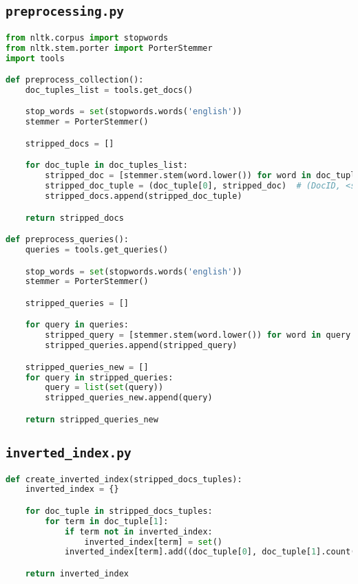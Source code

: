 \subsection{\texttt{preprocessing.py}}
\begin{lstlisting}[language=Python]
from nltk.corpus import stopwords
from nltk.stem.porter import PorterStemmer
import tools

def preprocess_collection():
    doc_tuples_list = tools.get_docs()

    stop_words = set(stopwords.words('english'))
    stemmer = PorterStemmer()

    stripped_docs = []

    for doc_tuple in doc_tuples_list:
        stripped_doc = [stemmer.stem(word.lower()) for word in doc_tuple[1] if word.lower() not in stop_words]
        stripped_doc_tuple = (doc_tuple[0], stripped_doc)  # (DocID, <stripped_doc>)
        stripped_docs.append(stripped_doc_tuple)

    return stripped_docs

def preprocess_queries():
    queries = tools.get_queries()

    stop_words = set(stopwords.words('english'))
    stemmer = PorterStemmer()

    stripped_queries = []

    for query in queries:
        stripped_query = [stemmer.stem(word.lower()) for word in query.split() if word.lower() not in stop_words]
        stripped_queries.append(stripped_query)

    stripped_queries_new = []
    for query in stripped_queries:
        query = list(set(query))
        stripped_queries_new.append(query)

    return stripped_queries_new
\end{lstlisting}


\subsection{\texttt{inverted\_index.py}}
\begin{lstlisting}[language=Python]
def create_inverted_index(stripped_docs_tuples):
    inverted_index = {}

    for doc_tuple in stripped_docs_tuples:
        for term in doc_tuple[1]:
            if term not in inverted_index:
                inverted_index[term] = set()
            inverted_index[term].add((doc_tuple[0], doc_tuple[1].count(term)))

    return inverted_index
\end{lstlisting}


